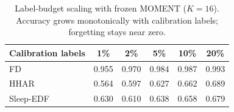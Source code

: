 \begin{table}[t]
\centering
\caption{Label-budget scaling with frozen MOMENT ($K{=}16$). Accuracy grows
monotonically with calibration labels; forgetting stays near zero.}
\label{tab:budget-moment}
\small
\begin{tabular}{l ccccc}
\toprule
Calibration labels & 1\% & 2\% & 5\% & 10\% & 20\%\\
\midrule
FD & 0.955 & 0.970 & 0.984 & 0.987 & 0.993\\
HHAR & 0.564 & 0.597 & 0.627 & 0.662 & 0.689\\
Sleep-EDF & 0.630 & 0.610 & 0.638 & 0.658 & 0.679\\
\bottomrule
\end{tabular}
\end{table}
